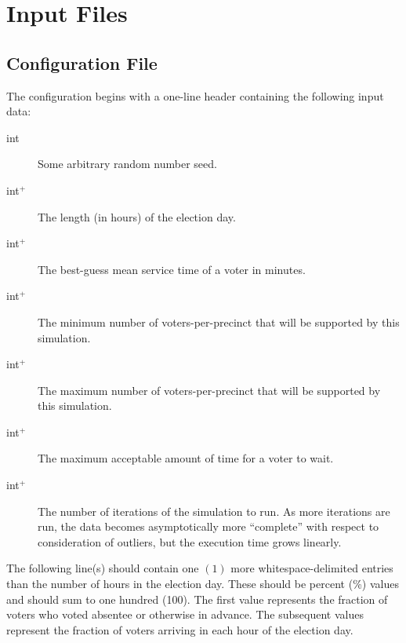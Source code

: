 \chapter{Input Files}

\section{Configuration File}

The configuration begins with a one-line header containing the following input data:

\begin{description}
\item[int] Some arbitrary random number seed.
\item[int$^+$] The length (in hours) of the election day.
\item[int$^+$] The best-guess mean service time of a voter in minutes.
\item[int$^+$] The minimum number of voters-per-precinct that will be supported by this simulation.
\item[int$^+$] The maximum number of voters-per-precinct that will be supported by this simulation.
\item[int$^+$] The maximum acceptable amount of time for a voter to wait.
\item[int$^+$] The number of iterations of the simulation to run. As more iterations are run, the data becomes asymptotically more ``complete'' with respect to consideration of outliers, but the execution time grows linearly.
\end{description}

The following line(s) should contain one $(1)$ more whitespace-delimited entries than the number of hours in the election day. These should be percent (\%) values and should sum to one hundred (100). The first value represents the fraction of voters who voted absentee or otherwise in advance. The subsequent values represent the fraction of voters arriving in each hour of the election day.
